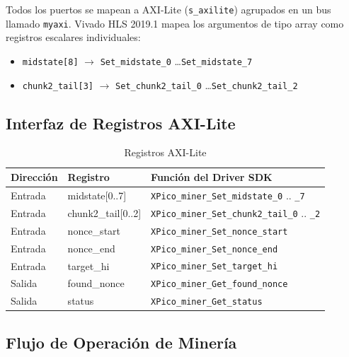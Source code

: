 \documentclass[12pt,a4paper]{article}
\begin{document}
Todos los puertos se mapean a AXI-Lite (\texttt{s\_axilite}) agrupados en un
bus llamado \texttt{myaxi}. Vivado HLS 2019.1 mapea los argumentos de tipo array
como registros escalares individuales:
\begin{itemize}[leftmargin=2em]
    \item \texttt{midstate[8]} $\rightarrow$ \texttt{Set\_midstate\_0} \ldots \texttt{Set\_midstate\_7}
    \item \texttt{chunk2\_tail[3]} $\rightarrow$ \texttt{Set\_chunk2\_tail\_0} \ldots \texttt{Set\_chunk2\_tail\_2}
\end{itemize}

\subsection{Interfaz de Registros AXI-Lite}

\begin{table}[h]
    \centering
    \caption{Registros AXI-Lite}
    \begin{tabular}{@{}lll@{}}
        \toprule
        \textbf{Direcci\'on} & \textbf{Registro} & \textbf{Funci\'on del Driver SDK} \\
        \midrule
        Entrada  & midstate[0..7]     & \texttt{XPico\_miner\_Set\_midstate\_0} .. \texttt{\_7} \\
        Entrada  & chunk2\_tail[0..2] & \texttt{XPico\_miner\_Set\_chunk2\_tail\_0} .. \texttt{\_2} \\
        Entrada  & nonce\_start       & \texttt{XPico\_miner\_Set\_nonce\_start} \\
        Entrada  & nonce\_end         & \texttt{XPico\_miner\_Set\_nonce\_end} \\
        Entrada  & target\_hi         & \texttt{XPico\_miner\_Set\_target\_hi} \\
        Salida   & found\_nonce       & \texttt{XPico\_miner\_Get\_found\_nonce} \\
        Salida   & status             & \texttt{XPico\_miner\_Get\_status} \\
        \bottomrule
    \end{tabular}
\end{table}

\subsection{Flujo de Operaci\'on de Miner\'ia}
\end{document}
